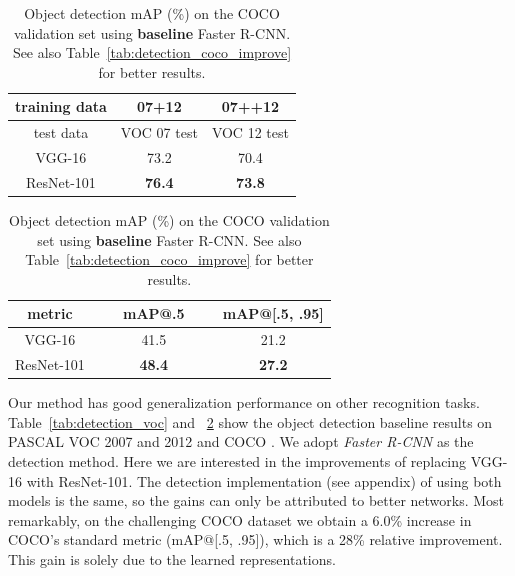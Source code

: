 \documentclass[10pt,twocolumn,letterpaper]{article}
\renewcommand\arraystretch{1.2}
\begin{document}
\renewcommand\arraystretch{1.05}
\setlength{\tabcolsep}{8pt}
\begin{table}[t]
  \begin{center}
    \small
    \begin{tabular}{c|c|c}
      \hline
      training data & 07+12         & 07++12        \\
      \hline
      test data     & VOC 07 test   & VOC 12 test   \\
      \hline
      VGG-16        & 73.2          & 70.4          \\
      ResNet-101    & \textbf{76.4} & \textbf{73.8} \\
      \hline
    \end{tabular}
  \end{center}
  \vspace{-.5em}
  \caption{Object detection mAP (\%) on the PASCAL VOC 2007/2012 test sets using \textbf{baseline} Faster R-CNN. See also Table~\ref{tab:voc07_all} and \ref{tab:voc12_all} for better results.
  }
  \vspace{-.5em}
  \label{tab:detection_voc}
  \setlength{\tabcolsep}{5pt}
  \begin{center}
    \small
    \begin{tabular}{c|c|c}
      \hline
      metric     & ~~~mAP@.5~~~  & mAP@[.5, .95] \\
      \hline
      VGG-16     & 41.5          & 21.2          \\
      ResNet-101 & \textbf{48.4} & \textbf{27.2} \\
      \hline
    \end{tabular}
  \end{center}
  \vspace{-.5em}
  \caption{Object detection mAP (\%) on the COCO validation set using \textbf{baseline} Faster R-CNN. See also Table~\ref{tab:detection_coco_improve} for better results.
  }
  \vspace{-.5em}
  \label{tab:detection_coco}
\end{table}

Our method has good generalization performance on other recognition tasks. Table~\ref{tab:detection_voc} and ~\ref{tab:detection_coco} show the object detection baseline results on PASCAL VOC 2007 and 2012 \cite{Everingham2010} and COCO \cite{Lin2014}. We adopt \emph{Faster R-CNN} \cite{Ren2015} as the detection method. Here we are interested in the improvements of replacing VGG-16 \cite{Simonyan2015} with ResNet-101. The detection implementation (see appendix) of using both models is the same, so the gains can only be attributed to better networks. Most remarkably, on the challenging COCO dataset we obtain a 6.0\% increase in COCO's standard metric (mAP@[.5, .95]), which is a 28\% relative improvement. This gain is solely due to the learned representations.
\end{document}
